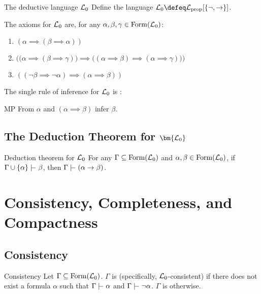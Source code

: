 \documentclass{styles/tufte}
\begin{document}
\begin{definition}{The deductive language $\LL_0$}{}
  Define the language $\LL_0 \defeq \Lprop[\set{\neg, \implies}]$.
  
  The axioms for $\LL_0$ are, for any $\alpha, \beta, \gamma \in \operatorname{Form}(\mathcal{L}_0)$:
  \begin{enumerate}
    \item $(\alpha \implies (\beta \implies \alpha))$
    \item $\big( \big(\alpha \implies (\beta \implies \gamma)\big) \implies \big((\alpha \implies \beta) \implies (\alpha \implies \gamma)\big) \big)$
    \item $((\neg\beta \implies \neg\alpha) \implies (\alpha \implies \beta))$
  \end{enumerate}
  
  The single rule of inference for $\LL_0$ is :
  
  MP From $\alpha$ and $(\alpha \implies \beta)$ infer $\beta$.
\end{definition}


\subsection[The Deduction Theorem for $\LL_0$]{The Deduction Theorem for $\bm{\LL_0}$}
  
  \begin{theorem}{Deduction theorem for $\LL_0$}{}
    For any $\Gamma \subseteq \operatorname{Form}(\mathcal{L}_0)$ and $\alpha, \beta \in \operatorname{Form}(\mathcal{L}_0)$, if $\Gamma \cup \set{\alpha} \proves \beta$, then $\Gamma \proves (\alpha \implies \beta)$.
  \end{theorem}



\section{Consistency, Completeness, and Compactness}

\subsection{Consistency}
  
  \begin{definition}{Consistency}{}
    Let $\Gamma \subseteq \operatorname{Form}(\mathcal{L}_0)$. $\Gamma$ is  (specifically, $\LL_0$-consistent) if there does not exist a formula $\alpha$ such that $\Gamma \proves \alpha$ and $\Gamma \proves \neg\alpha$. $\Gamma$ is  otherwise.
  \end{definition}
  
\end{document}
